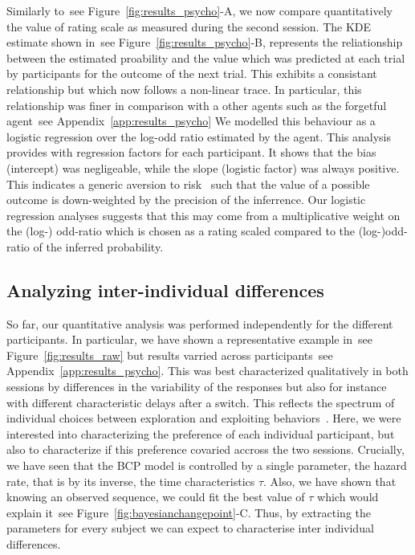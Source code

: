 \documentclass[profile,final,english, draft]{article}%
\newcommand{\citep}[1]{\parencite{#1}}
\newcommand{\seeFig}[1]{see Figure~\ref{fig:#1}}
\newcommand{\seeApp}[1]{see Appendix~\ref{app:#1}}
\begin{document}
Similarly to~\seeFig{results_psycho}-A,
we now compare quantitatively the value of rating scale
as measured during the second session.
The KDE estimate shown in~\seeFig{results_psycho}-B,
represents the reliationship between
the estimated proability
and the value which was predicted at each trial
by participants for the outcome of the next trial.
This exhibits a consistant relationship
but which now follows a non-linear trace.
In particular, this relationship was finer
in comparison with a other agents
such as the forgetful agent~\seeApp{results_psycho}
We modelled this behaviour as
a logistic regression over
the log-odd ratio estimated by the agent.
This analysis provides with regression factors for each participant.
It shows that the bias (intercept)
was negligeable, while the slope (logistic factor)
was always positive.
This indicates a generic aversion to risk~\citep{KanehmanXX}
such that the value of a possible outcome
is down-weighted by the precision of the inferrence.
Our logistic regression analyses
suggests that this may come from a multiplicative weight
on the (log-) odd-ratio which is chosen as a rating scaled
compared to the (log-)odd-ratio of the inferred probability.

\subsection{Analyzing inter-individual differences}
\label{sec:inter}
So far, our quantitative analysis was performed independently
for the different participants.
In particular, we have shown a representative example in~\seeFig{results_raw}
but results varried across participants~\seeApp{results_psycho}.
This was best characterized qualitatively in both sessions by differences
in the variability of the responses but also for instance
with different characteristic delays after a switch.
This reflects the spectrum of individual choices
between exploration and exploiting behaviors~\citep{Behrens?}.
Here, we were interested into characterizing the preference
of each individual participant, but also to characterize
if this preference covaried accross the two sessions.
Crucially, we have seen that the BCP model is controlled by a single parameter,
the hazard rate, that is by its inverse, the time characteristics $\tau$.
Also, we have shown that knowing an observed sequence,
we could fit the best value of $\tau$ which would explain it~\seeFig{bayesianchangepoint}-C.
Thus, by extracting the parameters for every subject
we can expect to characterise inter individual differences.
\end{document}
